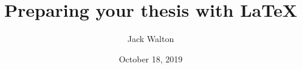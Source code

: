 \documentclass[12pt]{beamer}
\title{Preparing your thesis with \LaTeX}
\date{October 18, 2019}
\author{Jack Walton}
\institute{Newcastle University}
\begin{document}
\nocite{knuth84}

\maketitle









\end{document}
